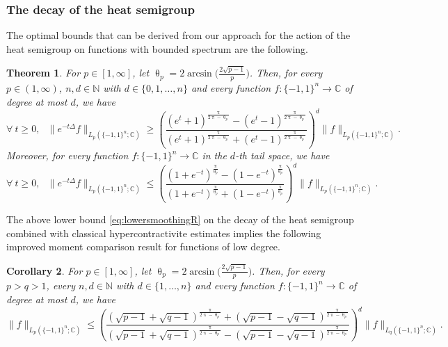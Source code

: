 \documentclass[11pt,reqno]{amsart}
\renewcommand{\leq}{\leqslant}
\renewcommand{\geq}{\geqslant}
\renewcommand{\pi}{\uppi}
\newcommand{\1}{\mathbf 1}
\newtheorem{theorem}{Theorem}
\newtheorem{corollary}[theorem]{Corollary}
\theoremstyle{remark}
\newcommand{\C}{\mathbb C}
\newcommand{\N}{\mathbb N}
\renewcommand{\theta}{\uptheta}
\renewcommand{\pi}{\uppi}
\renewcommand{\pi}{\uppi}
\begin{document}
\subsubsection{The decay of the heat semigroup} The optimal bounds that can be derived from our approach for the action of the heat semigroup on functions with bounded spectrum are the following.

\begin{theorem} \label{thm:smoothingR}
For $p\in[1,\infty]$, let $\theta_p = 2\arcsin\big(\frac{2\sqrt{p-1}}{p}\big)$. Then, for every $p\in(1,\infty)$, $n,d\in\N$ with $d\in\{0,1,\ldots,n\}$ and every function $f:\{-1,1\}^n\to\C$ of degree at most $d$, we have
\begin{equation} \label{eq:lowersmoothingR}
\forall \ t\geq0, \ \ \ \|e^{-t\Delta}f\|_{L_p(\{-1,1\}^n;\C)} \geq \left(\frac{(e^{t}+1)^{\frac{\pi}{2\pi-\theta_p}} - (e^{t}-1)^{\frac{\pi}{2\pi-\theta_p}}}{(e^{t}+1)^{\frac{\pi}{2\pi-\theta_p}} + (e^{t}-1)^{\frac{\pi}{2\pi-\theta_p}}}\right)^d \|f\|_{L_p(\{-1,1\}^n;\C)}.
\end{equation}
Moreover, for every function $f:\{-1,1\}^n\to\C$ in the $d$-th tail space, we have
\begin{equation} \label{eq:uppersmoothingR}
\forall \ t\geq0, \ \ \ \|e^{-t\Delta}f\|_{L_p(\{-1,1\}^n;\C)} \leq \left(\frac{(1+e^{-t})^{\frac{\pi}{\theta_p}} - (1-e^{-t})^{\frac{\pi}{\theta_p}}}{(1+e^{-t})^{\frac{\pi}{\theta_p}} + (1-e^{-t})^{\frac{\pi}{\theta_p}}}\right)^d \|f\|_{L_p(\{-1,1\}^n;\C)}.
\end{equation}
\end{theorem}


The above lower bound \eqref{eq:lowersmoothingR} on the decay of the heat semigroup combined with classical hypercontractivite estimates \cite{Bon70} implies the following improved moment comparison result for functions of low degree.

\begin{corollary} \label{cor:momentcompR} 
For $p\in[1,\infty]$, let $\theta_p = 2\arcsin\big(\frac{2\sqrt{p-1}}{p}\big)$. Then, for every $p>q>1$, every $n,d\in\N$ with $d\in\{1,\ldots,n\}$ and every function $f:\{-1,1\}^n\to\C$ of degree at most $d$, we have
\begin{equation}
 \|f\|_{L_p(\{-1,1\}^n;\C)} \leq \left(\frac{(\sqrt{p-1}+\sqrt{q-1})^{\frac{\pi}{2\pi-\theta_p}} + (\sqrt{p-1}-\sqrt{q-1})^{\frac{\pi}{2\pi-\theta_p}}}{(\sqrt{p-1}+\sqrt{q-1})^{\frac{\pi}{2\pi-\theta_p}} - (\sqrt{p-1}-\sqrt{q-1})^{\frac{\pi}{2\pi-\theta_p}}}\right)^d \|f\|_{L_q(\{-1,1\}^n;\C)}.
\end{equation}
\end{corollary}
\end{document}
